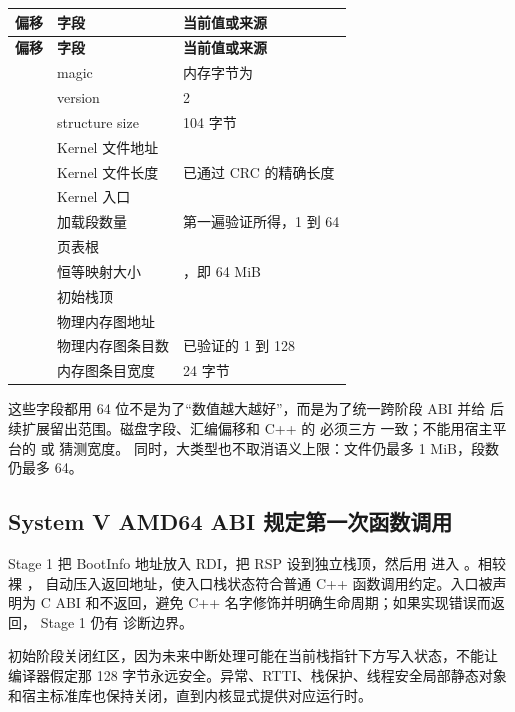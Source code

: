 \small
\begin{longtable}{L{0.14\textwidth}L{0.33\textwidth}L{0.39\textwidth}}
\toprule
\textbf{偏移} & \textbf{字段} & \textbf{当前值或来源}\\
\midrule
\endfirsthead
\toprule
\textbf{偏移} & \textbf{字段} & \textbf{当前值或来源}\\
\midrule
\endhead
{} & magic & 内存字节为 \\
 & version & 2\\
 & structure size & 104 字节\\
 & Kernel 文件地址 & \\
 & Kernel 文件长度 & 已通过 CRC 的精确长度\\
 & Kernel 入口 & \\
 & 加载段数量 & 第一遍验证所得，1 到 64\\
 & 页表根 & \\
 & 恒等映射大小 & ，即 64 MiB\\
 & 初始栈顶 & \\
 & 物理内存图地址 & \\
 & 物理内存图条目数 & 已验证的 1 到 128\\
 & 内存图条目宽度 & 24 字节\\
\bottomrule
\end{longtable}
\normalsize

这些字段都用 64 位不是为了“数值越大越好”，而是为了统一跨阶段 ABI 并给
后续扩展留出范围。磁盘字段、汇编偏移和 C++ 的  必须三方
一致；不能用宿主平台的  或  猜测宽度。
同时，大类型也不取消语义上限：文件仍最多 1 MiB，段数仍最多 64。

\subsection{System V AMD64 ABI 规定第一次函数调用}

Stage 1 把 BootInfo 地址放入 RDI，把 RSP 设到独立栈顶，然后用
 进入 。相较裸 ，
自动压入返回地址，使入口栈状态符合普通 C++ 函数调用约定。入口被声明为
C ABI 和不返回，避免 C++ 名字修饰并明确生命周期；如果实现错误而返回，
Stage 1 仍有  诊断边界。

初始阶段关闭红区，因为未来中断处理可能在当前栈指针下方写入状态，不能让
编译器假定那 128 字节永远安全。异常、RTTI、栈保护、线程安全局部静态对象
和宿主标准库也保持关闭，直到内核显式提供对应运行时。

